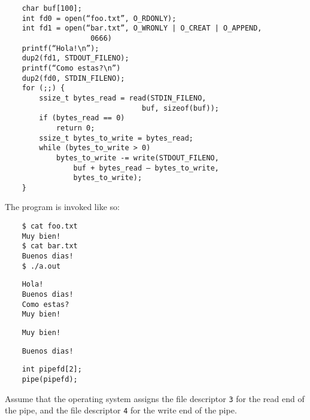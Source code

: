 \documentclass[11pt,largemargins]{homework}
\begin{document}
\maketitle


\begin{verbatim}
    char buf[100];
    int fd0 = open(“foo.txt”, O_RDONLY);
    int fd1 = open(“bar.txt”, O_WRONLY | O_CREAT | O_APPEND,
                    0666)
    printf(“Hola!\n”);
    dup2(fd1, STDOUT_FILENO);
    printf(“Como estas?\n”)
    dup2(fd0, STDIN_FILENO);
    for (;;) {
        ssize_t bytes_read = read(STDIN_FILENO,
                                buf, sizeof(buf));
        if (bytes_read == 0)
            return 0;
        ssize_t bytes_to_write = bytes_read;
        while (bytes_to_write > 0)
            bytes_to_write -= write(STDOUT_FILENO,
                buf + bytes_read – bytes_to_write,
                bytes_to_write);
    }
    \end{verbatim}

The program is invoked like so:

\begin{verbatim}
    $ cat foo.txt
    Muy bien!
    $ cat bar.txt
    Buenos dias!
    $ ./a.out
    \end{verbatim}

\begin{alphaparts}
    \begin{verbatim}
    Hola!
    Buenos dias!
    Como estas?
    Muy bien!
    \end{verbatim}

    \begin{verbatim}
    Muy bien!
    \end{verbatim}

    \begin{verbatim}
    Buenos dias!
    \end{verbatim}
\end{alphaparts}
\clearpage


\begin{verbatim}
    int pipefd[2];
    pipe(pipefd);
\end{verbatim}

Assume that the operating system assigns the file descriptor \texttt{3} for the
read end of the pipe, and the file descriptor \texttt{4} for the write end of
the pipe.
\end{document}
